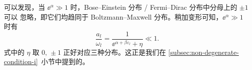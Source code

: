 可以发现，当 $\ee^{\alpha} \gg 1$ 时，Bose--Einstein 分布 / Fermi--Dirac 分布中分母上的 $\pm 1$ 可以
忽略，即它们均趋同于 Boltzmann--Maxwell 分布。稍加变形可知，$\ee^{\alpha} \gg 1$ 时有
\begin{equation}
  \frac{a_l}{\omega_l} = \frac{1}{\ee^{\alpha+\beta\varepsilon_l}+\eta} \ll 1.
\end{equation}
式中的 $\eta$ 取 $0, \, \pm 1$ 正好对应三种分布。这正是我们在
\ref{subsec:non-degenerate-condition-i}~小节中提到的。

